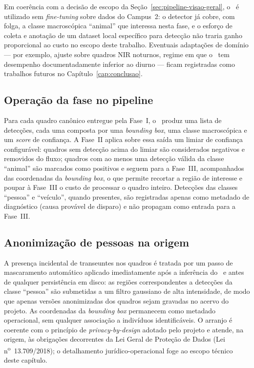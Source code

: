 Em coerência com a decisão de escopo da Seção~\ref{sec:pipeline-visao-geral}, o \modeloMD~é utilizado sem \emph{fine-tuning} sobre dados do Campus~2: o detector já cobre, com folga, a classe macroscópica ``animal'' que interessa nesta fase, e o esforço de coleta e anotação de um dataset local específico para detecção não traria ganho proporcional ao custo no escopo deste trabalho. Eventuais adaptações de domínio --- por exemplo, ajuste sobre quadros NIR noturnos, regime em que o \modeloMD~tem desempenho documentadamente inferior ao diurno --- ficam registradas como trabalhos futuros no Capítulo~\ref{cap:conclusao}.

\subsection*{Operação da fase no pipeline}

Para cada quadro canônico entregue pela Fase~I, o \modeloMD~produz uma lista de detecções, cada uma composta por uma \emph{bounding box}, uma classe macroscópica e um \emph{score} de confiança. A Fase~II aplica sobre essa saída um limiar de confiança configurável: quadros sem detecção acima do limiar são considerados negativos e removidos do fluxo; quadros com ao menos uma detecção válida da classe ``animal'' são marcados como positivos e seguem para a Fase~III, acompanhados das coordenadas da \emph{bounding box}, o que permite recortar a região de interesse e poupar à Fase~III o custo de processar o quadro inteiro. Detecções das classes ``pessoa'' e ``veículo'', quando presentes, são registradas apenas como metadado de diagnóstico (causa provável de disparo) e não propagam como entrada para a Fase~III.

\subsection*{Anonimização de pessoas na origem}

A presença incidental de transeuntes nos quadros é tratada por um passo de mascaramento automático aplicado imediatamente após a inferência do \modeloMD~e antes de qualquer persistência em disco: as regiões correspondentes a detecções da classe ``pessoa'' são submetidas a um filtro gaussiano de alta intensidade, de modo que apenas versões anonimizadas dos quadros sejam gravadas no acervo do projeto. As coordenadas da \emph{bounding box} permanecem como metadado operacional, sem qualquer associação a indivíduos identificáveis. O arranjo é coerente com o princípio de \emph{privacy-by-design} adotado pelo projeto e atende, na origem, às obrigações decorrentes da Lei Geral de Proteção de Dados (Lei n\textsuperscript{o}~13.709/2018); o detalhamento jurídico-operacional foge ao escopo técnico deste capítulo.


